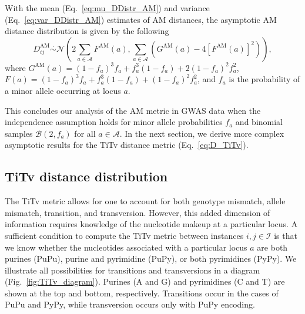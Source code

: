 \documentclass[10pt,letterpaper]{article}
\begin{document}
With the mean (Eq.~\ref{eq:mu_DDistr_AM}) and variance (Eq.~\ref{eq:var_DDistr_AM}) estimates of AM distances, the asymptotic AM distance distribution is given by the following
%
\begin{equation}\label{eq:DDistr_AM}
D^\text{AM}_{ij} \overset{.}{\sim} \mathcal{N}\left(2\sum_{a \in \mathcal{A}} F^\text{AM}(a), \sum_{a \in \mathcal{A}} \left(G^\text{AM}(a)- 4\left[F^\text{AM}(a)\right]^2\right)\right),
\end{equation}
%
where $G^\text{AM}(a) = (1 - f_a)^3 f_a + f^3_a (1 - f_a) + 2 (1 - f_a)^2 f^2_a$, $F(a) = (1 - f_a)^3 f_a + f^3_a (1 - f_a) + (1 - f_a)^2 f^2_a$, and $f_a$ is the probability of a minor allele occurring at locus $a$.

This concludes our analysis of the AM metric in GWAS data when the independence assumption holds for minor allele probabilities $f_a$ and binomial samples $\mathcal{B}(2,f_a)$ for all $a \in \mathcal{A}$. In the next section, we derive more complex asymptotic results for the TiTv distance metric (Eq.~\ref{eq:D_TiTv}).

\subsection*{TiTv distance distribution}\label{sec:TiTv_distances}

The TiTv metric allows for one to account for both genotype mismatch, allele mismatch, transition, and transversion. However, this added dimension of information requires knowledge of the nucleotide makeup at a particular locus. A sufficient condition to compute the TiTv metric between instances $i,j \in \mathcal{I}$ is that we know whether the nucleotides associated with a particular locus $a$ are both purines (PuPu), purine and pyrimidine (PuPy), or both pyrimidines (PyPy). We illustrate all possibilities for transitions and transversions in a diagram (Fig.~\ref{fig:TiTv_diagram}). Purines (A and G) and pyrimidines (C and T) are shown at the top and bottom, respectively. Transitions occur in the cases of PuPu and PyPy, while transversion occurs only with PuPy encoding.

\bigskip

\begin{minipage}[c]{0.62\textwidth}\hspace{-0.5cm}
\end{minipage}\hspace{-0.3cm}
\begin{minipage}[c]{0.35\textwidth}
	\captionsetup{type=figure}\label{fig:TiTv_diagram}
\end{minipage}
\end{document}
